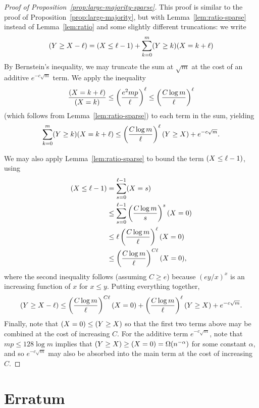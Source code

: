 \documentclass[EJP,final]{ejpecp}
\newcommand{\1}[1]{\mathbbm{1}_{\{#1\}}}
\let\Pr\relax
\DeclareMathOperator{\Pr}{Pr}
\begin{document}
\begin{proof}[Proof of Proposition~\ref{prop:large-majority-sparse}]
 This proof is similar to the proof of Proposition~\ref{prop:large-majority},
 but with Lemma~\ref{lem:ratio-sparse} instead of Lemma~\ref{lem:ratio}
 and some slightly different truncations:
 we write
 \[
   \Pr(Y \ge X - \ell) = \Pr(X \le \ell - 1)
   + \sum_{k=0}^m \Pr(Y \ge k) \Pr(X = k + \ell)
 \]
 By Bernstein's inequality, we may truncate the sum at $\sqrt m$
 at the cost of an additive $e^{-c \sqrt m}$ term.
 We apply the inequality
 \[
     \frac{\Pr(X = k + \ell)}{\Pr(X = k)} 
     \le \left(\frac{e^2 mp}{\ell}\right)^\ell
     \le \left(\frac{C \log m}{\ell}\right)^\ell
 \]
 (which follows from Lemma~\ref{lem:ratio-sparse}) to each term
 in the sum, yielding
 \[
   \sum_{k=0}^m \Pr(Y \ge k) \Pr(X = k + \ell)
   \le \left(\frac {C \log m}{\ell}\right)^\ell \Pr(Y \ge X) + e^{-c\sqrt m}.
 \]

 We may also apply
 Lemma~\ref{lem:ratio-sparse} to bound the term $\Pr(X \le \ell - 1)$, using
 \begin{align*}
   \Pr(X \le \ell - 1)
   &= \sum_{s=0}^{\ell - 1} \Pr(X = s) \\
   &\le \sum_{s=0}^{\ell - 1} \left(\frac{C \log m}{s}\right)^s \Pr(X = 0) \\
   &\le \ell \left(\frac{C \log m}{\ell}\right)^{\ell} \Pr(X = 0) \\
   &\le \left(\frac{C \log m}{\ell}\right)^{C\ell} \Pr(X = 0),
 \end{align*}
 where the second inequality follows (assuming $C \ge e$)
 because $(ey/x)^x$ is an increasing function of $x$ for $x \le y$.
 Putting everything together,
 \[
   \Pr(Y \ge X - \ell) \le 
    \left(\frac{C \log m}{\ell}\right)^{C\ell} \Pr(X = 0)
    + \left(\frac{C \log m}{\ell}\right)^{\ell} \Pr(Y \ge X)
    + e^{-c\sqrt m}.
 \]
 Finally, note that $\Pr(X = 0) \le \Pr(Y \ge X)$ so that the first
 two terms above may be combined at the cost of increasing $C$. For
 the additive term $e^{-c \sqrt m}$, note that $mp \le 128 \log m$
 implies that $\Pr(Y \ge X) \ge \Pr(X = 0) = \Omega(n^{-\alpha})$ for some
 constant $\alpha$, and so $e^{-c \sqrt m}$ may also be absorbed into
 the main term at the cost of increasing $C$.
\end{proof}

\section{Erratum}
\end{document}
